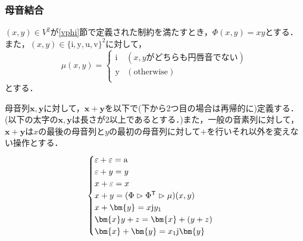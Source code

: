\documentclass[../../main-detail.tex]{subfiles}
\begin{document}
\subsubsection{母音結合}
\begin{definition}
$(x,y)\in V^2$が\ref{vphi}節で定義された制約を満たすとき，$\Phi(x,y)=xy$とする．また，$(x,y)\in\{\text{i},\text{y},\text{u},\text{v}\}^2$に対して，
\[\mu(x,y)=\begin{cases}
  \text{i} & (x,yがどちらも円唇音でない)\\
  \text{y} & (\text{otherwise})\\
\end{cases}\]
とする．
\end{definition}
\begin{definition}母音列$\bm{x},\bm{y}$に対して，$\bm{x}+\bm{y}$を以下で(下から2つ目の場合は再帰的に)定義する．(以下の太字の$\bm{x},\bm{y}$は長さが2以上であるとする．)また，一般の音素列に対して，$\bm{x}+\bm{y}$は$x$の最後の母音列と$y$の最初の母音列に対して$+$を行いそれ以外を変えない操作とする．
\[\begin{cases}
\varepsilon + \varepsilon = \text{a}\\
\varepsilon + y = y\\
x + \varepsilon = x\\
x + y = (\Phi \vlr \Phi^\trans \vlr \mu)(x,y)\\
x + \bm{y} = x\text{j}y_1\\
\bm{x}y + z = \bm{x} + (y + z)\\
\bm{x} + \bm{y} = x_1\text{j}\bm{y}\\
\end{cases}\]
\end{definition}
\end{document}
